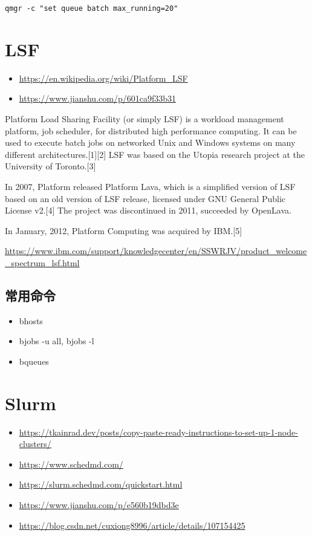 {\verb|qmgr -c "set queue batch max_running=20"|



\section{LSF}
\begin{itemize}
\item \url{https://en.wikipedia.org/wiki/Platform_LSF}
\item \url{https://www.jianshu.com/p/601ca9f33b31}
\end{itemize}


Platform Load Sharing Facility (or simply LSF) is a workload management platform, job scheduler, for distributed high performance computing. It can be used to execute batch jobs on networked Unix and Windows systems on many different architectures.[1][2] LSF was based on the Utopia research project at the University of Toronto.[3]

In 2007, Platform released Platform Lava, which is a simplified version of LSF based on an old version of LSF release, licensed under GNU General Public License v2.[4] The project was discontinued in 2011, succeeded by OpenLava.

In January, 2012, Platform Computing was acquired by IBM.[5]


\url{https://www.ibm.com/support/knowledgecenter/en/SSWRJV/product_welcome_spectrum_lsf.html}



\subsection{常用命令}
\begin{itemize}
\item bhosts
\item bjobs -u all, bjobs -l
\item bqueues
\end{itemize}




\section{Slurm}
\begin{itemize}
\item \url{https://tkainrad.dev/posts/copy-paste-ready-instructions-to-set-up-1-node-clusters/}
\item \url{https://www.schedmd.com/}
\item \url{https://slurm.schedmd.com/quickstart.html}
\item \url{https://www.jianshu.com/p/e560b19dbd3e}
\item \url{https://blog.csdn.net/cuxiong8996/article/details/107154425}
\end{itemize}


}
